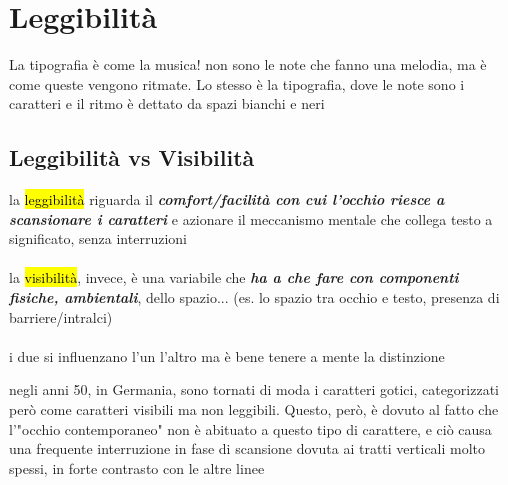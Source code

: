 \chapter{Leggibilità}
\begin{mdframed}[style=mystyle,frametitle=]
       La tipografia è come la musica! non sono le note che fanno una melodia, ma è come queste vengono ritmate.
       Lo stesso è la tipografia, dove le note sono i caratteri e il ritmo è dettato da spazi bianchi e neri
    \end{mdframed}
\section{Leggibilità vs Visibilità}
la \hl{leggibilità} riguarda il \textbf{\textit{comfort/facilità con cui l'occhio riesce a scansionare i caratteri}} e azionare il meccanismo mentale che collega testo a significato, senza interruzioni 
\\\\
la \hl{visibilità}, invece, è una variabile che \textbf{\textit{ha a che fare con componenti fisiche, ambientali}}, dello spazio... (es. lo spazio tra occhio e testo, presenza di barriere/intralci)
\\\\
i due si influenzano l'un l'altro ma è bene tenere a mente la distinzione

    \begin{mdframed}[style=mystyle,frametitle=Paradosso dei caratteri gotici]
       negli anni 50, in Germania, sono tornati di moda i caratteri gotici,  categorizzati però come caratteri visibili ma non leggibili. Questo, però, è dovuto al fatto che l'"occhio contemporaneo" non è abituato a questo tipo di carattere, e ciò causa una frequente interruzione in fase di scansione dovuta ai tratti verticali molto spessi, in forte contrasto con le altre linee
    \end{mdframed}

